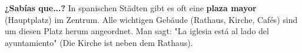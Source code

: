 \documentclass[11pt, a4paper]{article}
\newcommand{\seriftext}[1]{{\fontfamily{ppl}\selectfont #1}}
\newcommand{\es}[1]{\seriftext{\textbf{#1}}}
\begin{document}
\vspace{6pt}


\begin{tippbox}
\textbf{¿Sabías que...?} In spanischen Städten gibt es oft eine \es{plaza mayor} (Hauptplatz) im Zentrum. Alle wichtigen Gebäude (Rathaus, Kirche, Cafés) sind um diesen Platz herum angeordnet. Man sagt: "La iglesia está al lado del ayuntamiento" (Die Kirche ist neben dem Rathaus).
\end{tippbox}
\end{document}
